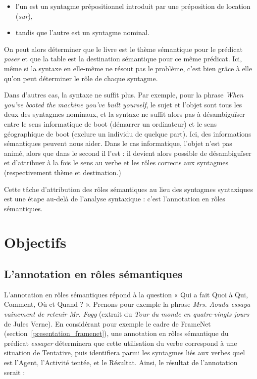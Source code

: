 \begin{itemize}
    \item l'un est un syntagme prépositionnel introduit par une préposition de
    location (\emph{sur}),
    \item tandis que l'autre est un syntagme nominal.
\end{itemize}

On peut alors déterminer que le livre est le thème sémantique pour le prédicat
\emph{poser} et que la table est la destination sémantique pour ce même
prédicat. Ici, même si la syntaxe en elle-même ne résout pas le problème, c'est
bien grâce à elle qu'on peut déterminer le rôle de chaque syntagme.

Dans d'autres cas, la syntaxe ne suffit plus. Par exemple, pour la phrase
\emph{When you've booted the machine you've built yourself}, le sujet et
l'objet sont tous les deux des syntagmes nominaux, et la syntaxe ne suffit
alors pas à désambiguïser entre le sens informatique de boot (démarrer un
ordinateur) et le sens géographique de boot (exclure un individu de quelque
part). Ici, des informations sémantiques peuvent nous aider. Dans le cas
informatique, l'objet n'est pas animé, alors que dans le second il l'est : il
devient alors possible de désambiguïser et d'attribuer à la fois le sens au
verbe et les rôles corrects aux syntagmes (respectivement thème et
destination.)

Cette tâche d'attribution des rôles sémantiques au lieu des syntagmes
syntaxiques est une étape au-delà de l'analyse syntaxique : c'est l'annotation
en rôles sémantiques.

\section{Objectifs}

\subsection{L'annotation en rôles sémantiques}

L'annotation en rôles sémantiques répond à la question « Qui a fait Quoi à Qui,
Comment, Où et Quand ? ». Prenons pour exemple la phrase \emph{Mrs. Aouda
essaya vainement de retenir Mr. Fogg} (extrait du \emph{Tour du monde en
quatre-vingts jours} de Jules Verne).  En considérant pour exemple le cadre de
FrameNet (section~\ref{presentation_framenet}), une annotation en rôles
sémantique du prédicat \emph{essayer} déterminera que cette utilisation du
verbe correspond à une situation de Tentative, puis identifiera parmi les
syntagmes liés aux verbes quel est l'Agent, l'Activité tentée, et le Résultat.
Ainsi, le résultat de l'annotation serait :

